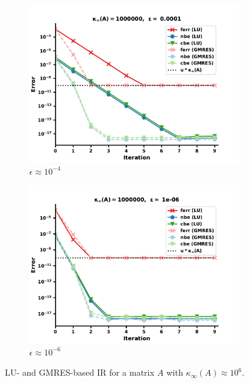 \begin{figure}
\centering
\begin{subfigure}{.5\textwidth}
  \centering
  \includegraphics[width=\linewidth]{chapters/5_experiments/figures/LR512e2_0.pdf}
  \caption{$\epsilon \approx 10^{-4}$}
  \label{fig:lrir3_1}
\end{subfigure}%
\begin{subfigure}{.5\textwidth}
  \centering
  \includegraphics[width=\linewidth]{chapters/5_experiments/figures/LR512e2_1.pdf}
  \caption{$\epsilon \approx 10^{-6}$}
  \label{fig:lrir3_2}
\end{subfigure}
\caption[Low-Rank IR 3]{LU- and GMRES-based IR for a matrix $A$ with $\kappa_\infty(A) \approx 10^6$.}
\label{fig:lrir3}
\end{figure}

